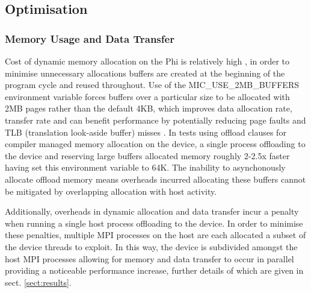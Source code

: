 \documentclass[runningheads,a4paper]{llncs}
\begin{document}



\subsection{Optimisation}
\label{sect:micoptimisation}


\subsubsection{Memory Usage and Data Transfer}
\label{sect:memusage}

Cost of dynamic memory allocation on the Phi is relatively high \cite{mem_alloc}, in order to minimise unnecessary allocations 
buffers are created at the beginning of the program cycle and reused throughout. Use of the MIC\_USE\_2MB\_BUFFERS 
environment variable forces buffers over a particular size to be allocated with 2MB pages rather than the default 4KB, 
which improves data allocation rate, transfer rate and can benefit performance by potentially reducing page 
faults and TLB (translation look-aside buffer) misses \cite{env_var_buf}. In tests using offload clauses for compiler 
managed memory allocation on the device, a single process offloading to the device and reserving large buffers allocated 
memory roughly 2-2.5x faster having set this environment variable to 64K. The inability to asynchonously allocate offload 
memory means overheads incurred allocating these buffers cannot be mitigated by overlapping allocation with host activity.


Additionally, overheads in dynamic allocation and data transfer incur a penalty when running a single host process 
offloading to the device. In order to minimise these penalties, multiple MPI processes on the host are each allocated 
a subset of the device threads to exploit. In this way, the device is subdivided amongst the host MPI processes allowing 
for memory and data transfer to occur in parallel providing a noticeable performance increase, further details of which are 
given in sect. \ref{sect:results}.
\end{document}
